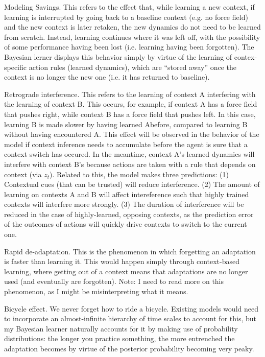 \documentclass{report}
\begin{document}
\begin{chapter}{Modeling}
Savings. This refers to the effect that, while learning a new context, if
learning is interrupted by going back to a baseline context (e.g. no force
field) and the new context is later retaken, the new dynamics do not need to be
learned from scratch. Instead, learning continues where it was left off, with
the possibility of some performance having been lost (i.e. learning having been
forgotten). The Bayesian lerner displays this behavior simply by virtue of the
learning of contex-specific action rules (learned dynamics), which are ``stored
away'' once the context is no longer the new one (i.e. it has returned to
baseline).

Retrograde interference. This refers to the learning of context A interfering
with the learning of context B. This occurs, for example, if context A has a
force field that pushes right, while context B has a force field that pushes
left. In this case, learning B is made slower by having learned Abefore,
compared to learning B without having encountered A. This effect will be
observed in the behavior of the model if context inference needs to accumulate
before the agent is sure that a context switch has occured. In the meantime,
context A's learned dynamics will interfere with context B's because actions are
taken with a rule that depends on context (via $z_t$). Related to this, the
model makes three predictions: (1) Contextual cues (that can be trusted) will
reduce interference. (2) The amount of learning on contexts A and B will affect
intereference such that highly trained contexts will interfere more
strongly. (3) The duration of interference will be reduced in the case of
highly-learned, opposing contexts, as the prediction error of the outcomes of
actions will quickly drive contexts to switch to the current one.

Rapid de-adaptation. This is the phenomenon in which forgetting an adaptation is
faster than learning it. This would happen simply through context-based
learning, where getting out of a context means that adaptations are no longer
used (and eventually are forgotten). Note: I need to read more on this
phenomenon, as I might be misinterpreting what it means.

Bicycle effect. We never forget how to ride a bicycle. Existing models would
need to incorporate an almost-infinite hierarchy of time scales to account for
this, but my Bayesian learner naturally accounts for it by making use of
probability distributions: the longer you practice something, the more
entrenched the adaptation becomes by virtue of the posterior probability
becoming very peaky.


\end{chapter}
\end{document}
